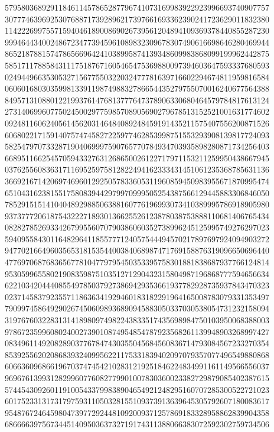 {{    5795803689291184611457865287796741073169983922923996693740907757 ~
    3077746396925307688717392896217397661693362390241723629011832380 ~
    1142226997557159404618900869026739561204894109369378440855287230 ~
    9994644340024867234773945961089832309678307490616698646280469944 ~
    8652187881574786566964241038995874139348609983868099199962442875 ~
    5851711788584311175187671605465475369880097394603647593337680593 ~
    0249449663530532715677550322032477781639716602294674811959816584 ~
    0606016803035998133911987498832786654435279755070016240677564388 ~
    8495713108801221993761476813777647378906330680464579784817613124 ~
    2731406996077502450029775985708905690279678513152521001631774602 ~
    0924811606240561456203146484089248459191435211575407556200871526 ~
    6068022171591407574745827225977462853998751553293908139817724093 ~
    5825479707332871904069997590765770784934703935898280871734256403 ~
    6689511662545705943327631268650026122717971153211259950438667945 ~
    0376255608363171169525975812822494162333431451061235368785631136 ~
    3669216714206974696012925057833605311960859450983955671870995474 ~
    6510431623815517580839442979970999505254387566129445883306846050 ~
    7852915151410404892988506388160776196993073410389995786918905980 ~
    9373777206187543222718930136625526123878038753888110681406765434 ~
    0828278526933426799556070790386060352738996245125995749276297023 ~
    5940955843011648296411855777124057544494570217897697924094903272 ~
    9477021664960356531815354400384068987471769158876319096650696440 ~
    4776970687683656778104779795450353395758301881838687937766124814 ~
    9530599655802190835987510351271290432315804987196868777594656634 ~
    6221034204440855497850379273869429353661937782928735937843470323 ~
    0237145837923557118636341929460183182291964165008783079331353497 ~
    7909974586492902674506098936890945883050337030538054731232158094 ~
    3197676032283131418980974982243833517435698984750103950068388003 ~
    9786723599608024002739010874954854787923568261139948903268997427 ~
    0834961149208289037767847430355045684560836714793084567233270354 ~
    8539255620208683932409956221175331839402097079357077496549880868 ~
    6066360968661967037474542102831219251846224834991161149566556037 ~
    9696761399312829960776082779901007830360023382729879085402387615 ~
    5744543092601191005433799838904654921248295160707285300522721023 ~
    6017523313173179759311050328155109373913639645305792607180083617 ~
    9548767246459804739772924481092009371257869183328958862839904358 ~
    6866663975673445140950363732719174311388066383072592302759734506 ~
}}
